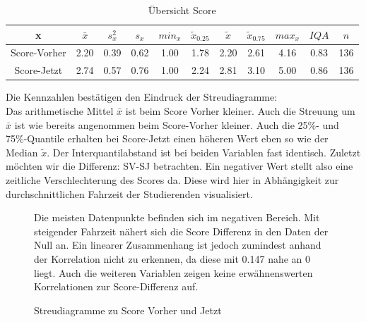\documentclass[11pt, a4paper]{article}
\begin{document}
\begin{table}[h]
	\vspace{-1cm}
	\centering
	\begin{tabular}{c|ccccccccc|c}
		x & $\bar{x}$ & $s_x^2$ & $s_x$ & $min_x$ & $\tilde{x}_{0.25}$ & $\tilde{x}$ & $\tilde{x}_{0.75}$ & $max_x$ & $IQA$ & $n$ \\ \hline
		Score-Vorher & 2.20 & 0.39 & 0.62 & 1.00 & 1.78 & 2.20 & 2.61 & 4.16 & 0.83 & 136 \\
		Score-Jetzt & 2.74 & 0.57 & 0.76 & 1.00 & 2.24 & 2.81 & 3.10 & 5.00 & 0.86 & 136
	\end{tabular}
	\caption{Übersicht Score}
\end{table}

\newpage
	Die Kennzahlen bestätigen den Eindruck der Streudiagramme:\\
Das arithmetische Mittel $\bar{x}$ ist beim Score Vorher kleiner.
Auch die Streuung um $\bar{x}$ ist wie bereits angenommen beim Score-Vorher kleiner. Auch die 25\%- und 75\%-Quantile erhalten bei Score-Jetzt einen höheren Wert eben so wie der Median $\tilde{x}$.
Der Interquantilabstand ist bei beiden Variablen fast identisch.
	Zuletzt möchten wir die Differenz: SV-SJ betrachten. Ein negativer Wert stellt also eine zeitliche Verschlechterung des Scores da.
Diese wird hier in Abhängigkeit zur durchschnittlichen Fahrzeit der Studierenden visualisiert.
\begin{figure}[h]
	{\centering 
		\vspace{-2cm}
		\caption{Streudiagramme zu Score Vorher und Jetzt}}
		\raggedright
		
		Die meisten Datenpunkte befinden sich im negativen Bereich. Mit steigender Fahrzeit nähert sich die Score Differenz in den Daten der Null an. 
		Ein linearer Zusammenhang ist jedoch zumindest anhand der Korrelation nicht zu erkennen, da diese mit 0.147 nahe an 0 liegt. 
		Auch die weiteren Variablen zeigen keine erwähnenswerten Korrelationen zur Score-Differenz auf. 
		
		
\end{figure}



\leavevmode
\newpage
\end{document}
